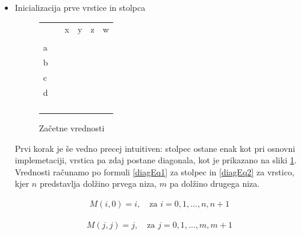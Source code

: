 \documentclass[a4paper,12pt,openright]{book}
\begin{document}
\begin{itemize}
    \item Inicializacija prve vrstice in stolpca
    
\begin{figure}[htb]
\centering
\begin{tabular}{|l|l|l|l|l|l|}
\cline{3-6}
\multicolumn{2}{c|}{}  & x & y & z & w \\ \cline{2-6}
\multicolumn{1}{c|}{} & \cellcolor{blue!15}{0} & \multicolumn{4}{c}{} \\ \cline{1-3}
a  & \cellcolor{blue!15}{1} & \cellcolor{blue!15}{1} & \multicolumn{3}{c}{} \\ \cline{1-4}
b  & \cellcolor{blue!15}{2} & & \cellcolor{blue!15}{2} & \multicolumn{2}{c}{}  \\ \cline{1-5}
c  & \cellcolor{blue!15}{3} & & & \cellcolor{blue!15}{3} & \multicolumn{1}{c}{} \\ \cline{1-6}
d  & \cellcolor{blue!15}{4} & & & & \cellcolor{blue!15}{4} \\ \hline
 \multicolumn{1}{c|}{} & & & & & \multicolumn{1}{c}{}  \\ \cline{2-5}
\multicolumn{1}{c|}{} & & & & \multicolumn{2}{c}{}   \\ \cline{2-4}
\multicolumn{1}{c|}{} & & &  \multicolumn{3}{c}{}   \\ \cline{2-3}
\multicolumn{1}{c|}{} & & \multicolumn{4}{c}{}  \\ \cline{2-2}
\end{tabular}
\caption{Začetne vrednosti}
\label{diagMemory1}
\end{figure}

Prvi korak je še vedno precej intuitiven: stolpec ostane enak kot pri osnovni implemetaciji, vrstica pa zdaj postane diagonala, kot je prikazano na sliki \ref{diagMemory1}. Vrednosti računamo po formuli \ref{diagEq1} za stolpec in \ref{diagEq2} za vrstico, kjer $n$ predstavlja dolžino prvega niza, $m$ pa dolžino drugega niza.

\begin{equation}
\label{diagEq1}
\begin{aligned}
M(i, 0) = i , \quad \text{za } i=0,1,...,n,n+1
\end{aligned}
\end{equation}

\begin{equation}
\label{diagEq2}
\begin{aligned}
M(j, j) = j , \quad \text{za } j=0,1,...,m,m+1
\end{aligned}
\end{equation}
    

\end{itemize}
\end{document}
